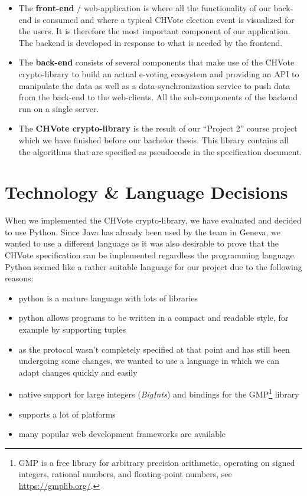 \begin{itemize}
	\item The \textbf{front-end} / web-application is where all the functionality of our back-end is consumed and where a typical CHVote election event is visualized for the users. It is therefore the most important component of our application. The backend is developed in response to what is needed by the frontend.
	\item The \textbf{back-end} consists of several components that make use of the CHVote crypto-library to build an actual e-voting ecosystem and providing an API to manipulate the data as well as a data-synchronization service to push data from the back-end to the web-clients. All the sub-components of the backend run on a single server.
	\item The \textbf{CHVote crypto-library} is the result of our "`Project 2"' course project which we have finished before our bachelor thesis. This library contains all the algorithms that are specified as pseudocode in the specification document.
\end{itemize}

\section{Technology \& Language Decisions}
When we implemented the CHVote crypto-library, we have evaluated and decided to use Python. Since Java has already been used by the team in Geneva, we wanted to use a different language as it was also desirable to prove that the CHVote specification can be implemented regardless the programming language. Python seemed like a rather suitable language for our project due to the following reasons:
\begin{itemize}
	\item python is a mature language with lots of libraries
	\item python allows programs to be written in a compact and readable style, for example by supporting tuples
	\item as the protocol wasn't completely specified at that point and has still been undergoing some changes, we wanted to use a language in which we can adapt changes quickly and easily
	\item native support for large integers (\textit{BigInts}) and bindings for the GMP\footnote{GMP is a free library for arbitrary precision arithmetic, operating on signed integers, rational numbers, and floating-point numbers, see \url{https://gmplib.org/}.} library
	\item supports a lot of platforms
	\item many popular web development frameworks are available
\end{itemize}

